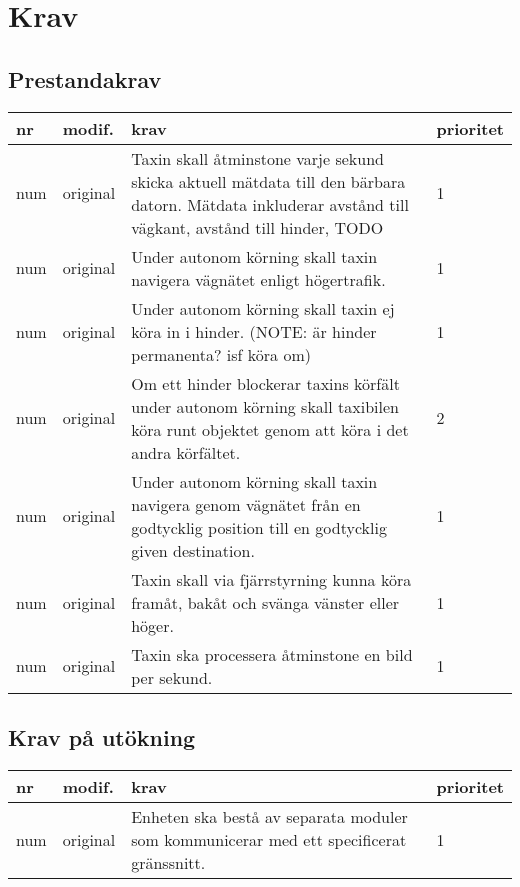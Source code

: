 \documentclass[kravspec/krav.tex]{subfiles}
\newenvironment{reqlist}
{
    \begin{tabular}{|l|l|p{10cm}|l|}
    \hline
    \bfseries nr &
    \bfseries modif. &
    \bfseries krav &
    \bfseries prioritet \\
}{
    \hline
    \end{tabular}
}
\newcommand{\req}[3]{
    \hline
    num & #1 & #3 & #2 \\
}
\begin{document}
\section{Krav}
\subsection{Prestandakrav}
\begin{reqlist}
\req{original}{1}{
    Taxin skall åtminstone varje sekund skicka aktuell mätdata till den bärbara
    datorn. Mätdata inkluderar avstånd till vägkant, avstånd till hinder, TODO
}
\req{original}{1}{
    Under autonom körning skall taxin navigera vägnätet enligt högertrafik.
}
\req{original}{1}{
    Under autonom körning skall taxin ej köra in i hinder. (NOTE: är hinder
    permanenta? isf köra om)
}
\req{original}{2}{
    Om ett hinder blockerar taxins körfält under autonom körning skall
    taxibilen köra runt objektet genom att köra i det andra körfältet.
}
\req{original}{1}{
    Under autonom körning skall taxin navigera genom vägnätet från en
    godtycklig position till en godtycklig given destination.
}
\req{original}{1}{
    Taxin skall via fjärrstyrning kunna köra framåt, bakåt och svänga vänster
    eller höger.
}
\req{original}{1}{
    Taxin ska processera åtminstone en bild per sekund.
}
\end{reqlist}

\subsection{Krav på utökning}
\begin{reqlist}
\req{original}{1}{
    Enheten ska bestå av separata moduler som kommunicerar med ett specificerat
    gränssnitt.
}
\end{reqlist}
\end{document}
